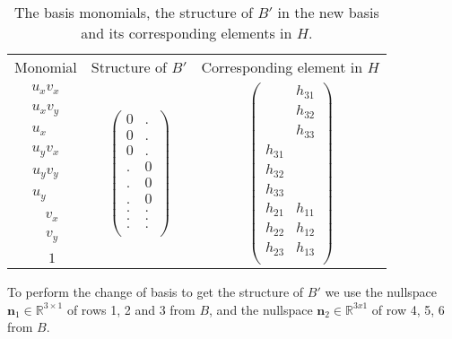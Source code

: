 \begin{table}[H]
\centering
\begin{tabular}{ c c c }
	Monomial & Structure of $B'$ & Corresponding element in $H$ \\
	$u_x v_x$ & \multirow{9}{*}{
$\begin{pmatrix}
	0 & . \\
	0 & . \\
	0 & . \\
	. & 0 \\
	. & 0 \\
	. & 0 \\
	. & . \\
	. & . \\
	. & . \\
\end{pmatrix}$
} & \multirow{9}{*}{
$\begin{pmatrix}
 & h_{31} \\
 & h_{32} \\
 & h_{33} \\
h_{31} &   \\
h_{32} &   \\
h_{33} &   \\
h_{21} & h_{11} \\
h_{22} & h_{12} \\
h_{23} & h_{13} \\
\end{pmatrix}$
} \\
	$u_x v_y$ & \\
	$u_x \ \ \ \ $ & \\    
	\hline
	$u_y v_x$ & \\
	$u_y v_y$ & \\
	$u_y \ \ \ \ $ & \\    
	\hline
	$\ \ \ \ v_x$ & \\
	$\ \ \ \ v_y$ & \\
	$\ \ \ \ 1$ & \\
\end{tabular}
\caption{The basis monomials, the structure of $B'$ in the new basis and its corresponding elements in $H$.}
\label{table:H}
\end{table}

To perform the change of basis to get the structure of $B'$ we use the nullspace $\textbf{n}_1 \in \mathbb{R}^{3\times 1}$ of rows 1, 2 and 3 from $B$, and the nullspace $\textbf{n}_2 \in \mathbb{R}^{3x1}$ of row 4, 5, 6 from $B$.

